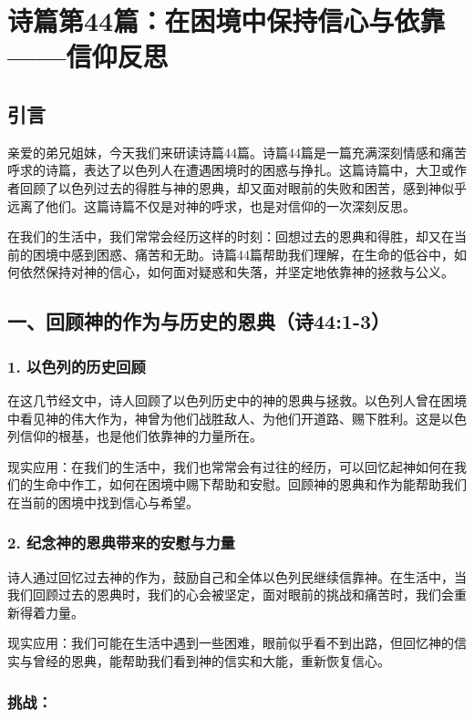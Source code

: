 \documentclass[a4paper, 12pt]{article}
\begin{document}
\section{诗篇第44篇：在困境中保持信心与依靠——信仰反思}
\subsection*{引言}
\hspace{0.6cm}亲爱的弟兄姐妹，今天我们来研读诗篇44篇。诗篇44篇是一篇充满深刻情感和痛苦呼求的诗篇，表达了以色列人在遭遇困境时的困惑与挣扎。这篇诗篇中，大卫或作者回顾了以色列过去的得胜与神的恩典，却又面对眼前的失败和困苦，感到神似乎远离了他们。这篇诗篇不仅是对神的呼求，也是对信仰的一次深刻反思。

在我们的生活中，我们常常会经历这样的时刻：回想过去的恩典和得胜，却又在当前的困境中感到困惑、痛苦和无助。诗篇44篇帮助我们理解，在生命的低谷中，如何依然保持对神的信心，如何面对疑惑和失落，并坚定地依靠神的拯救与公义。

\subsection*{一、回顾神的作为与历史的恩典（诗44:1-3）}

\subsubsection*{1. 以色列的历史回顾}
\hspace{0.6cm}在这几节经文中，诗人回顾了以色列历史中的神的恩典与拯救。以色列人曾在困境中看见神的伟大作为，神曾为他们战胜敌人、为他们开道路、赐下胜利。这是以色列信仰的根基，也是他们依靠神的力量所在。

现实应用：在我们的生活中，我们也常常会有过往的经历，可以回忆起神如何在我们的生命中作工，如何在困境中赐下帮助和安慰。回顾神的恩典和作为能帮助我们在当前的困境中找到信心与希望。
\subsubsection*{2. 纪念神的恩典带来的安慰与力量}
\hspace{0.6cm}诗人通过回忆过去神的作为，鼓励自己和全体以色列民继续信靠神。在生活中，当我们回顾过去的恩典时，我们的心会被坚定，面对眼前的挑战和痛苦时，我们会重新得着力量。

现实应用：我们可能在生活中遇到一些困难，眼前似乎看不到出路，但回忆神的信实与曾经的恩典，能帮助我们看到神的信实和大能，重新恢复信心。
\subsubsection*{挑战：}
\end{document}
